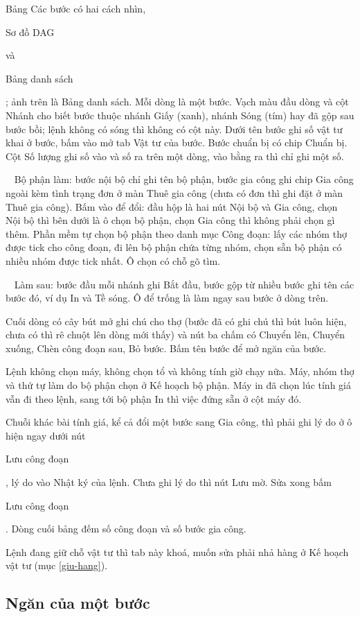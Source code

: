\documentclass[11pt,a4paper]{article}
\newcommand{\oo}[1]{{\setlength{\fboxsep}{1.2pt}\colorbox{vang}{\strut #1}}}
\newcommand{\so}[1]{{\tieude\bfseries\small\textcolor{white}{\colorbox{red!80!black}{\kern-2pt#1\kern-2pt}}}}
\newcommand{\q}[1]{\textquotedbl#1\textquotedbl{}}
\begin{document}
Bảng Các bước có hai cách nhìn, \oo{Sơ đồ DAG} và \oo{Bảng danh sách}; ảnh trên là Bảng danh sách. Mỗi dòng là một
bước. Vạch màu đầu dòng và cột Nhánh cho biết bước thuộc nhánh Giấy (xanh), nhánh Sóng (tím) hay đã gộp sau bước
bồi; lệnh không có sóng thì không có cột này. Dưới tên bước ghi số vật tư khai ở bước, bấm vào mở tab Vật tư của
bước. Bước chuẩn bị có chip \q{Chuẩn bị}. Cột Số lượng ghi số vào và số ra trên một dòng, vào bằng ra thì chỉ ghi
một số.

\so{4} Bộ phận làm: bước nội bộ chỉ ghi tên bộ phận, bước gia công ghi chip \q{Gia công ngoài} kèm tình trạng đơn
ở màn Thuê gia công (chưa có đơn thì ghi \q{đặt ở màn Thuê gia công}). Bấm vào để đổi: đầu hộp là hai nút Nội bộ
và Gia công, chọn Nội bộ thì bên dưới là ô chọn bộ phận, chọn Gia công thì không phải chọn gì thêm. Phần mềm tự
chọn bộ phận theo danh mục Công đoạn: lấy các nhóm thợ được tick cho công đoạn, đi lên bộ phận chứa từng nhóm, chọn
sẵn bộ phận có nhiều nhóm được tick nhất. Ô chọn có chỗ gõ tìm.

\so{5} Làm sau: bước đầu mỗi nhánh ghi \q{Bắt đầu}, bước gộp từ nhiều bước ghi tên các bước đó, ví dụ \q{In và Tề
sóng}. Ô để trống là làm ngay sau bước ở dòng trên.

Cuối dòng có cây bút mở ghi chú cho thợ (bước đã có ghi chú thì bút luôn hiện, chưa có thì rê chuột lên dòng mới
thấy) và nút ba chấm có Chuyển lên, Chuyển xuống, Chèn công đoạn sau, Bỏ bước. Bấm tên bước để mở ngăn của bước.

Lệnh không chọn máy, không chọn tổ và không tính giờ chạy nữa. Máy, nhóm thợ và thứ tự làm do bộ phận chọn ở Kế
hoạch bộ phận. Máy in đã chọn lúc tính giá vẫn đi theo lệnh, sang tới bộ phận In thì việc đứng sẵn ở cột máy đó.

Chuỗi khác bài tính giá, kể cả đổi một bước sang Gia công, thì phải ghi lý do ở ô hiện ngay dưới nút \oo{Lưu công đoạn}, lý do vào Nhật ký của lệnh. Chưa ghi lý do thì nút Lưu mờ. Sửa xong bấm \oo{Lưu công
đoạn}. Dòng cuối bảng đếm số công đoạn và số bước gia công.

Lệnh đang giữ chỗ vật tư thì tab này khoá, muốn sửa phải nhả hàng ở Kế hoạch vật tư (mục \ref{giu-hang}).

\subsection{Ngăn của một bước}\label{ngan-buoc}
\end{document}
